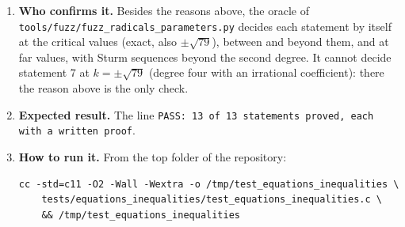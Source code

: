 \documentclass[11pt,a4paper]{article}
\begin{document}
\begin{enumerate}
\item \textbf{Who confirms it.} Besides the reasons above, the oracle of \texttt{tools/fuzz/fuzz\_radicals\_parameters.py} decides each statement by itself at the critical values (exact, also $\pm\sqrt{79}$), between and beyond them, and at far values, with Sturm sequences beyond the second degree. It cannot decide statement 7 at $k = \pm\sqrt{79}$ (degree four with an irrational coefficient): there the reason above is the only check.

\item \textbf{Expected result.} The line \texttt{PASS: 13 of 13 statements proved, each with a written proof}.

\item \textbf{How to run it.} From the top folder of the repository:
\begin{verbatim}
cc -std=c11 -O2 -Wall -Wextra -o /tmp/test_equations_inequalities \
    tests/equations_inequalities/test_equations_inequalities.c \
    && /tmp/test_equations_inequalities
\end{verbatim}
\end{enumerate}
\end{document}
